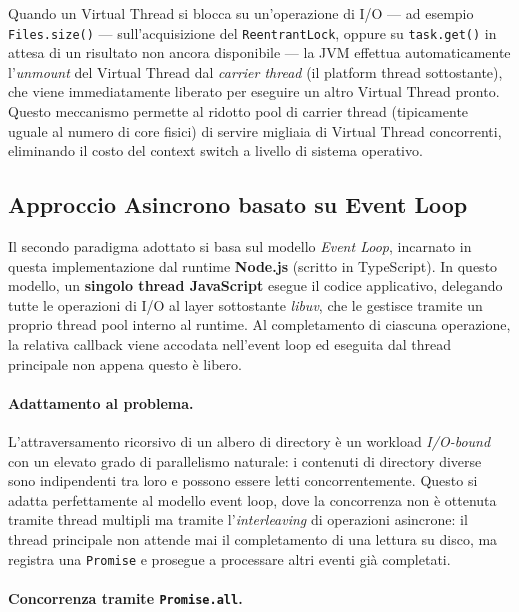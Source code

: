 \documentclass[11pt,a4paper]{article}
\begin{document}
Quando un Virtual Thread si blocca su un'operazione di I/O — ad esempio \texttt{Files.size()} — sull'acquisizione del \texttt{ReentrantLock}, oppure su \texttt{task.get()} in attesa di un risultato non ancora
disponibile — la JVM effettua automaticamente l'\textit{unmount} del Virtual Thread dal \textit{carrier thread} (il platform thread sottostante), che viene immediatamente liberato
 per eseguire un altro Virtual Thread pronto.
 Questo meccanismo permette al ridotto pool di carrier thread (tipicamente uguale al numero di core fisici) di servire migliaia di Virtual Thread concorrenti, eliminando il costo del
 context switch a livello di sistema operativo.


\subsection{Approccio Asincrono basato su Event Loop}

Il secondo paradigma adottato si basa sul modello \textit{Event Loop}, incarnato in questa implementazione dal runtime \textbf{Node.js} (scritto in TypeScript). In questo modello, un \textbf{singolo thread JavaScript} esegue il codice applicativo, delegando tutte le operazioni di I/O al layer sottostante \textit{libuv}, che le gestisce tramite un proprio thread pool interno al runtime. Al completamento di ciascuna operazione, la relativa callback viene accodata nell'event loop ed eseguita dal thread principale non appena questo è libero.

\paragraph{Adattamento al problema.}

L'attraversamento ricorsivo di un albero di directory è un workload \textit{I/O-bound} con un elevato grado di parallelismo naturale: i contenuti di directory diverse sono indipendenti tra loro e possono essere letti concorrentemente. Questo si adatta perfettamente al modello event loop, dove la concorrenza non è ottenuta tramite thread multipli ma tramite l'\textit{interleaving} di operazioni asincrone: il thread principale non attende mai il completamento di una lettura su disco, ma registra una \texttt{Promise} e prosegue a processare altri eventi già completati.

\paragraph{Concorrenza tramite \texttt{Promise.all}.}
\end{document}
